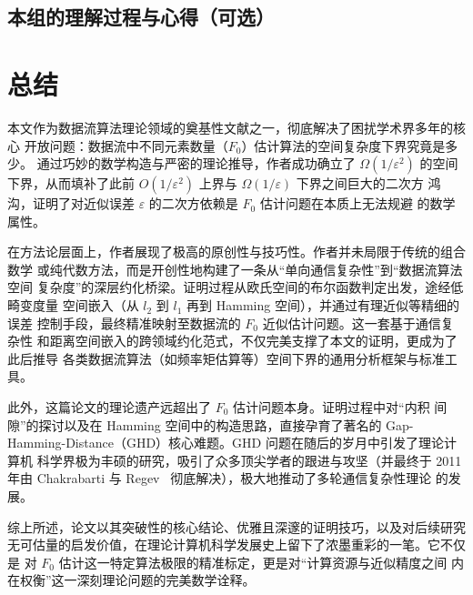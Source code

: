 \documentclass[UTF8, 11pt, a4paper, linestretch=1.15]{ctexart}
\theoremstyle{zhstyle}
\newcommand{\eps}{\varepsilon}
\newcommand{\Fzero}{F_0}
\begin{document}
	\subsection{本组的理解过程与心得（可选）}
	
	\section{总结}
	
	本文作为数据流算法理论领域的奠基性文献之一，彻底解决了困扰学术界多年的核心
	开放问题：数据流中不同元素数量（$\Fzero$）估计算法的空间复杂度下界究竟是多少。
	通过巧妙的数学构造与严密的理论推导，作者成功确立了 $\Omega(1/\eps^2)$ 的空间
	下界，从而填补了此前 $O(1/\eps^2)$ 上界与 $\Omega(1/\eps)$ 下界之间巨大的二次方
	鸿沟，证明了对近似误差 $\eps$ 的二次方依赖是 $\Fzero$ 估计问题在本质上无法规避
	的数学属性。
	
	在方法论层面上，作者展现了极高的原创性与技巧性。作者并未局限于传统的组合数学
	或纯代数方法，而是开创性地构建了一条从“单向通信复杂性”到“数据流算法空间
	复杂度”的深层约化桥梁。证明过程从欧氏空间的布尔函数判定出发，途经低畸变度量
	空间嵌入（从 $l_2$ 到 $l_1$ 再到 Hamming 空间），并通过有理近似等精细的误差
	控制手段，最终精准映射至数据流的 $\Fzero$ 近似估计问题。这一套基于通信复杂性
	和距离空间嵌入的跨领域约化范式，不仅完美支撑了本文的证明，更成为了此后推导
	各类数据流算法（如频率矩估算等）空间下界的通用分析框架与标准工具。
	
	此外，这篇论文的理论遗产远超出了 $\Fzero$ 估计问题本身。证明过程中对“内积
	间隙”的探讨以及在 Hamming 空间中的构造思路，直接孕育了著名的
	Gap-Hamming-Distance（GHD）核心难题。GHD 问题在随后的岁月中引发了理论计算机
	科学界极为丰硕的研究，吸引了众多顶尖学者的跟进与攻坚（并最终于 2011 年由
	Chakrabarti 与 Regev~\cite{CR11} 彻底解决），极大地推动了多轮通信复杂性理论
	的发展。
	
	综上所述，论文以其突破性的核心结论、优雅且深邃的证明技巧，以及对后续研究
	无可估量的启发价值，在理论计算机科学发展史上留下了浓墨重彩的一笔。它不仅是
	对 $\Fzero$ 估计这一特定算法极限的精准标定，更是对“计算资源与近似精度之间
	内在权衡”这一深刻理论问题的完美数学诠释。
	
\end{document}
